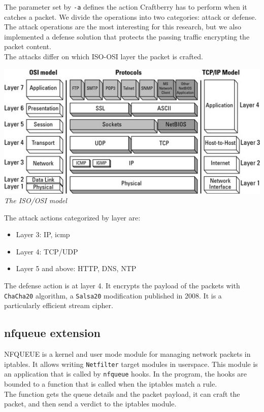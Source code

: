 \documentclass[12pt]{article}
\begin{document}
	The parameter set by \lstinline{-a} defines the action Craftberry has to perform when it catches a packet. We divide the operations into two categories: attack or defense. The attack operations are the most interesting for this research, but we also implemented a defense solution that protects the passing traffic encrypting the packet content.\\
	The attacks differ on which ISO-OSI layer the packet is crafted.\\
	
	\bigbreak

	\begin{center}
		\includegraphics[width=0.7\linewidth]{images/iso_osi_layers.jpg}
		\small{\textit{The ISO/OSI model}}
	\end{center}

	\bigbreak
	
	The attack actions categorized by layer are:
	\begin{itemize}
		\item Layer 3: IP, icmp
		\item Layer 4: TCP/UDP
		\item Layer 5 and above: HTTP, DNS, NTP
	\end{itemize}

	\bigbreak
	The defense action is at layer 4. It encrypts the payload of the packets with \lstinline{ChaCha20} algorithm, a \lstinline{Salsa20} modification published in 2008. It is a particularly efficient stream cipher.\\

	\subsection{nfqueue extension}
	NFQUEUE is a kernel and user mode module for managing network packets in iptables. It allows writing \lstinline{Netfilter} target modules in userspace. This module is an application that is called by \lstinline{nfqueue} hooks. In the program, the hooks are bounded to a function that is called when the iptables match a rule.\\
	The function gets the queue details and the packet payload, it can craft the packet, and then send a verdict to the iptables module. 
	\bigbreak
\end{document}
